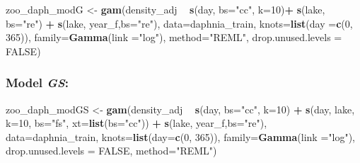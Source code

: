 \documentclass[12pt]{article}
\newenvironment{Shaded}{\begin{snugshade}}{\end{snugshade}}
\newcommand{\KeywordTok}[1]{\textcolor[rgb]{0.13,0.29,0.53}{\textbf{#1}}}
\newcommand{\DataTypeTok}[1]{\textcolor[rgb]{0.13,0.29,0.53}{#1}}
\newcommand{\DecValTok}[1]{\textcolor[rgb]{0.00,0.00,0.81}{#1}}
\newcommand{\StringTok}[1]{\textcolor[rgb]{0.31,0.60,0.02}{#1}}
\newcommand{\OtherTok}[1]{\textcolor[rgb]{0.56,0.35,0.01}{#1}}
\newcommand{\OperatorTok}[1]{\textcolor[rgb]{0.81,0.36,0.00}{\textbf{#1}}}
\newcommand{\NormalTok}[1]{#1}
\begin{document}
\begin{Shaded}
\begin{Highlighting}[]
\NormalTok{zoo_daph_modG <-}\StringTok{ }\KeywordTok{gam}\NormalTok{(density_adj }\OperatorTok{~}\StringTok{ }\KeywordTok{s}\NormalTok{(day, }\DataTypeTok{bs=}\StringTok{"cc"}\NormalTok{, }\DataTypeTok{k=}\DecValTok{10}\NormalTok{)}\OperatorTok{+}
\StringTok{                       }\KeywordTok{s}\NormalTok{(lake, }\DataTypeTok{bs=}\StringTok{"re"}\NormalTok{) }\OperatorTok{+}\StringTok{ }
\StringTok{                       }\KeywordTok{s}\NormalTok{(lake, year_f,}\DataTypeTok{bs=}\StringTok{"re"}\NormalTok{),}
                     \DataTypeTok{data=}\NormalTok{daphnia_train,}
                     \DataTypeTok{knots=}\KeywordTok{list}\NormalTok{(}\DataTypeTok{day =}\KeywordTok{c}\NormalTok{(}\DecValTok{0}\NormalTok{, }\DecValTok{365}\NormalTok{)),}
                     \DataTypeTok{family=}\KeywordTok{Gamma}\NormalTok{(}\DataTypeTok{link =}\StringTok{"log"}\NormalTok{),}
                     \DataTypeTok{method=}\StringTok{"REML"}\NormalTok{,}
                     \DataTypeTok{drop.unused.levels =} \OtherTok{FALSE}\NormalTok{)}
\end{Highlighting}
\end{Shaded}

\subsubsection{\texorpdfstring{Model
\emph{GS}:}{Model GS:}}\label{model-gs}

\begin{Shaded}
\begin{Highlighting}[]
\NormalTok{zoo_daph_modGS <-}
\StringTok{  }\KeywordTok{gam}\NormalTok{(density_adj }\OperatorTok{~}\StringTok{ }\KeywordTok{s}\NormalTok{(day, }\DataTypeTok{bs=}\StringTok{"cc"}\NormalTok{, }\DataTypeTok{k=}\DecValTok{10}\NormalTok{) }\OperatorTok{+}\StringTok{ }
\StringTok{        }\KeywordTok{s}\NormalTok{(day, lake, }\DataTypeTok{k=}\DecValTok{10}\NormalTok{, }\DataTypeTok{bs=}\StringTok{"fs"}\NormalTok{, }\DataTypeTok{xt=}\KeywordTok{list}\NormalTok{(}\DataTypeTok{bs=}\StringTok{"cc"}\NormalTok{)) }\OperatorTok{+}\StringTok{ }
\StringTok{        }\KeywordTok{s}\NormalTok{(lake, year_f,}\DataTypeTok{bs=}\StringTok{"re"}\NormalTok{),}
      \DataTypeTok{data=}\NormalTok{daphnia_train, }
      \DataTypeTok{knots=}\KeywordTok{list}\NormalTok{(}\DataTypeTok{day=}\KeywordTok{c}\NormalTok{(}\DecValTok{0}\NormalTok{, }\DecValTok{365}\NormalTok{)), }
      \DataTypeTok{family=}\KeywordTok{Gamma}\NormalTok{(}\DataTypeTok{link =}\StringTok{"log"}\NormalTok{),}
      \DataTypeTok{drop.unused.levels =} \OtherTok{FALSE}\NormalTok{,}
      \DataTypeTok{method=}\StringTok{"REML"}\NormalTok{)}
\end{Highlighting}
\end{Shaded}
\end{document}
